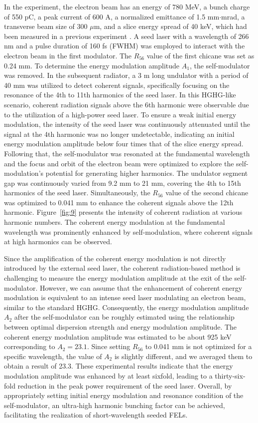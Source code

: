 \documentclass[%
 reprint,
 amsmath,amssymb,
 aps,
]{revtex4-2}
\begin{document}
In the experiment, the electron beam has an energy of 780 MeV, a bunch charge of 550 pC, a peak current of 600 A, a normalized emittance of 1.5 mm$\cdot$mrad, a transverse beam size of 300 $\mu$m, and a slice energy spread of 40 keV, which had been measured in a previous experiment \citep{Yan2021}. A seed laser with a wavelength of 266 nm and a pulse duration of 160 fs (FWHM) was employed to interact with the electron beam in the first modulator. The $R_{56}$ value of the first chicane was set as 0.24 mm. To determine the energy modulation amplitude $A_1$, the self-modulator was removed. In the subsequent radiator, a 3 m long undulator with a period of 40 mm was utilized to detect coherent signals, specifically focusing on the resonance of the 4th to 11th harmonics of the seed laser. In this HGHG-like scenario, coherent radiation signals above the 6th harmonic were observable due to the utilization of a high-power seed laser. To ensure a weak initial energy modulation, the intensity of the seed laser was continuously attenuated until the signal at the 4th harmonic was no longer undetectable, indicating an initial energy modulation amplitude below four times that of the slice energy spread. Following that, the self-modulator was resonated at the fundamental wavelength and the focus and orbit of the electron beam were optimized to explore the self-modulation's potential for generating higher harmonics. The undulator segment gap was continuously varied from 9.2 mm to 21 mm, covering the 4th to 15th harmonics of the seed laser. Simultaneously, the $R_{56}$ value of the second chicane was optimized to 0.041 mm to enhance the coherent signals above the 12th harmonic. Figure~\ref{fig:9} presents the intensity of coherent radiation at various harmonic numbers. The coherent energy modulation at the fundamental wavelength was prominently enhanced by self-modulation, where coherent signals at high harmonics can be observed.

Since the amplification of the coherent energy modulation is not directly introduced by the external seed laser, the coherent radiation-based method \citep{Feng2011} is challenging to measure the energy modulation amplitude at the exit of the self-modulator. However, we can assume that the enhancement of coherent energy modulation is equivalent to an intense seed laser modulating an electron beam, similar to the standard HGHG. Consequently, the energy modulation amplitude $A_2$ after the self-modulator can be roughly estimated using the relationship between optimal dispersion strength and energy modulation amplitude. The coherent energy modulation amplitude was estimated to be about 925 keV corresponding to $A_2=23.1$. Since setting $R_{56}$ to 0.041 mm is not optimized for a specific wavelength, the value of $A_2$ is slightly different, and we averaged them to obtain a result of 23.3. These experimental results indicate that the energy modulation amplitude was enhanced by at least sixfold, leading to a thirty-six-fold reduction in the peak power requirement of the seed laser. Overall, by appropriately setting initial energy modulation and resonance condition of the self-modulator, an ultra-high harmonic bunching factor can be achieved, facilitating the realization of short-wavelength seeded FELs.
\end{document}
